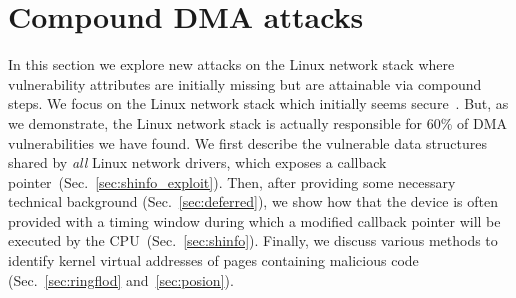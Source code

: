 \section{Compound DMA attacks}\label{sec:linux_net}



In this section we explore new attacks on the Linux network stack where vulnerability attributes are initially missing but are attainable via compound steps.
We focus on the Linux network stack which initially seems secure~\cite{thunder}. 
But, as we demonstrate, the Linux network stack is actually responsible for 60\% of DMA vulnerabilities we have found.
We first describe the vulnerable data structures shared by \emph{all} Linux network drivers, which exposes a callback pointer~(Sec.~\ref{sec:shinfo_exploit}). Then, after providing some necessary technical background (Sec.~\ref{sec:deferred}), we show how that the device is often provided with a timing window during which a modified callback pointer will be executed by the CPU~(Sec.~\ref{sec:shinfo}). Finally, we discuss various methods to identify kernel virtual addresses of pages containing malicious code (Sec.~\ref{sec:ringflod} and~\ref{sec:posion}). 

